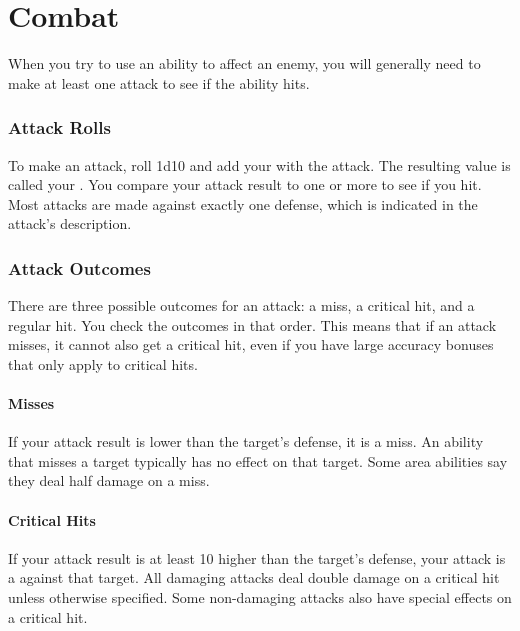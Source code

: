 \chapter{Combat}\label{Combat}

  When you try to use an ability to affect an enemy, you will generally need to make at least one attack to see if the ability hits.

  \subsection{Attack Rolls}\label{Attack Rolls}
    To make an attack, roll 1d10 and add your  with the attack.
    The resulting value is called your .
    You compare your attack result to one or more  to see if you hit.
    Most attacks are made against exactly one defense, which is indicated in the attack's description.

  \subsection{Attack Outcomes}
    There are three possible outcomes for an attack: a miss, a critical hit, and a regular hit.
    You check the outcomes in that order.
    This means that if an attack misses, it cannot also get a critical hit, even if you have large accuracy bonuses that only apply to critical hits.

    \subsubsection{Misses}
      If your attack result is lower than the target's defense, it is a miss.
      An ability that misses a target typically has no effect on that target.
      Some area abilities say they deal half damage on a miss.

    \subsubsection{Critical Hits}\label{Critical Hits}
      If your attack result is at least 10 higher than the target's defense, your attack is a  against that target.
      All damaging attacks deal double damage on a critical hit unless otherwise specified.
      Some non-damaging attacks also have special effects on a critical hit.

